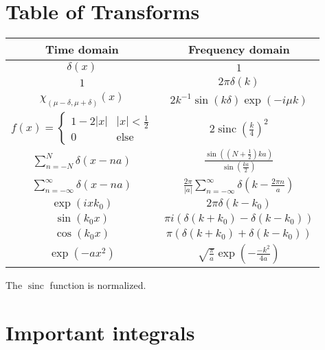 \documentclass[12pt]{report}
\DeclareMathOperator{\sinc}{sinc}
\begin{document}
\section{Table of Transforms}

\begin{center}
\begin{tabular}{c|c}
	Time domain & Frequency domain \\ \hline
	$\delta(x)$  & $1$ \\
	$1$ & $2\pi\delta(k)$ \\
	$\chi_{(\mu-\delta,\mu+\delta)}(x)$ & $2k^{-1}\sin\left(k\delta\right)\exp(-i\mu k)$ \\
	$f(x) = \begin{cases} 1-2|x|& |x| <\frac{1}{2}\\ 0& \text{else}\end{cases}$ & $2\sinc\left(\frac{k}{4}\right)^2$ \\
	$\sum_{n=-N}^N\delta(x-na)$ & $\frac{\sin\left(\left(N+\frac{1}{2}\right)ka\right)}{\sin\left(\frac{ka}{2}\right)}$\\
	$\sum_{n=-\infty}^\infty\delta(x-na) $ & $\frac{2\pi}{|a|}\sum_{n=-\infty}^\infty\delta\left(k-\frac{2\pi n}{a}\right)$  \\
	$\exp(ixk_0)$ & $ 2\pi\delta(k-k_0)$ \\
	$\sin(k_0x)$ & $\pi i (\delta(k+k_0)-\delta(k-k_0))$\\
	$\cos(k_0x)$ & $\pi  (\delta(k+k_0)+\delta(k-k_0))$\\
	$\exp(-ax^2)$&$ \sqrt{\frac{\pi}{a}}\exp\left(-\frac{-k^2}{4a}\right)$ \\
\end{tabular}
\end{center}

The $\sinc$ function is normalized.

\section{Important integrals}
\end{document}
